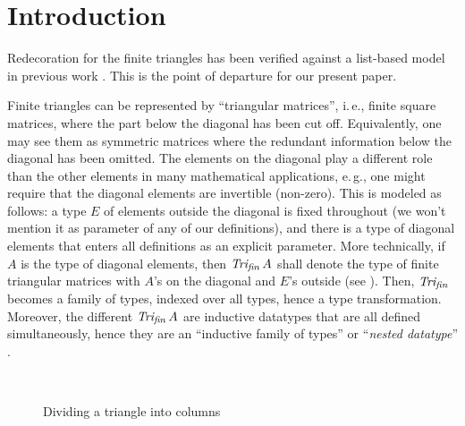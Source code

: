 \section{Introduction}\label{sect:intro}
Redecoration for the finite
triangles has been verified against a list-based model in previous work
\cite{types07}. This is the point of departure for our present paper.

Finite triangles can be represented by ``triangular matrices'',
i.\,e., finite square matrices, where the part below the diagonal has
been cut off.  Equivalently, one may see them as symmetric matrices
where the redundant information below the diagonal has been
omitted. The elements on the diagonal play a different role than the
other elements in many mathematical applications, e.\,g., one might
require that the diagonal elements are invertible (non-zero). This is
modeled as follows: a type $E$ of elements outside the diagonal is
fixed throughout (we won't mention it as parameter of any of our
definitions), and there is a type of diagonal elements that enters all
definitions as an explicit parameter. More technically, if $A$ is the type of
diagonal elements, then $\mathit{Tri_{fin}}\,A$ shall denote the type of finite
triangular matrices with $A$'s on the diagonal and $E$'s outside (see
). Then, $\mathit{Tri_{fin}}$ becomes a family of types, indexed
over all types, hence a type transformation. Moreover, the different
$\mathit{Tri_{fin}}\,A$ are inductive datatypes that are all defined
simultaneously, hence they are an ``inductive family of types'' or
``\emph{nested datatype}'' \cite{birdmeertens}.

\begin{figure}[h]
  \centering
  \\[-2ex]
  \caption{Dividing a triangle into columns}
  \label{fig:visu_col}
\end{figure}

